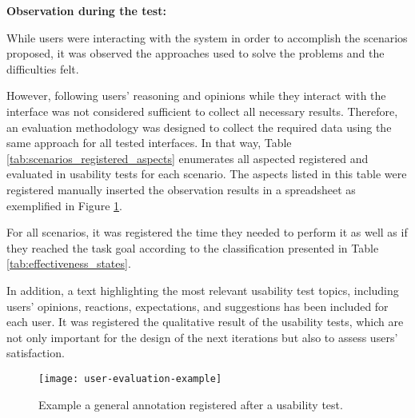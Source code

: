 \medskip
\textbf{Observation during the test:}
\medskip

While users were interacting with the system in order to accomplish the scenarios proposed, it was observed the approaches used to solve the problems and the difficulties felt.

However, following users' reasoning and opinions while they interact with the interface was not considered sufficient to collect all necessary results. Therefore, an evaluation methodology was designed to collect the required data using the same approach for all tested interfaces. In that way, Table \ref{tab:scenarios_registered_aspects} enumerates all aspected registered and evaluated in usability tests for each scenario. The aspects listed in this table were registered manually inserted the observation results in a spreadsheet as exemplified in Figure \ref{fig:userEvaluationExample}.

For all scenarios, it was registered the time they needed to perform it as well as if they reached the task goal according to the classification presented in Table \ref{tab:effectiveness_states}. 

In addition, a text highlighting the most relevant usability test topics, including users' opinions, reactions, expectations, and suggestions has been included for each user. It was registered the qualitative result of the usability tests, which are not only important for the design of the next iterations but also to assess users' satisfaction.






\begin{figure}[htbp]
	\centering
	\texttt{[image: user-evaluation-example]}
	\caption{Example a general annotation registered after a usability test.}
	\label{fig:userEvaluationExample}
\end{figure}



